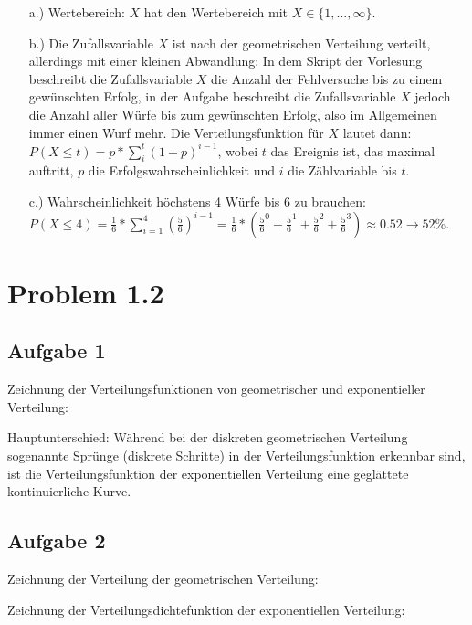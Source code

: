 \documentclass[%
10pt,              %
ngerman,           %
a4paper,           %
DIV11,             %
]{scrartcl}%
\begin{document}
\begin{itemize}
	\item[a.)] Wertebereich: $X$ hat den Wertebereich mit $X \in \{1, \dots, \infty \}$.
	\item[b.)] Die Zufallsvariable $X$ ist nach der geometrischen Verteilung verteilt, allerdings mit einer kleinen Abwandlung: In dem Skript der Vorlesung beschreibt die Zufallsvariable $X$ die Anzahl der Fehlversuche bis zu einem gewünschten Erfolg, in der Aufgabe beschreibt die Zufallsvariable $X$ jedoch die Anzahl aller Würfe bis zum gewünschten Erfolg, also im Allgemeinen immer einen Wurf mehr. Die Verteilungsfunktion für $X$ lautet dann: $P(X \leq t) = p * \sum_{i}^{t} (1-p)^{i-1}$, wobei $t$ das Ereignis ist, das maximal auftritt, $p$ die Erfolgswahrscheinlichkeit und $i$ die Zählvariable bis $t$. 
	\item[c.)] Wahrscheinlichkeit höchstens 4 Würfe bis 6 zu brauchen:\newline
	$P(X \leq 4) = \frac{1}{6} * \sum_{i = 1}^{4} (\frac{5}{6})^{i-1} = \frac{1}{6} * ( \frac{5}{6}^0 + \frac{5}{6}^1 + \frac{5}{6}^2 + \frac{5}{6}^3) \approx 0.52 \rightarrow 52\%$.
\end{itemize}

\section*{Problem 1.2}

\subsection*{Aufgabe 1}

Zeichnung der Verteilungsfunktionen von geometrischer und exponentieller Verteilung:\newline
 


\noindent
Hauptunterschied: Während bei der diskreten geometrischen Verteilung sogenannte Sprünge (diskrete Schritte) in der Verteilungsfunktion erkennbar sind, ist die Verteilungsfunktion der exponentiellen Verteilung eine geglättete kontinuierliche Kurve. 

\subsection*{Aufgabe 2}

Zeichnung der Verteilung der geometrischen Verteilung:\newline

Zeichnung der Verteilungsdichtefunktion der exponentiellen Verteilung:\newline
\end{document}
